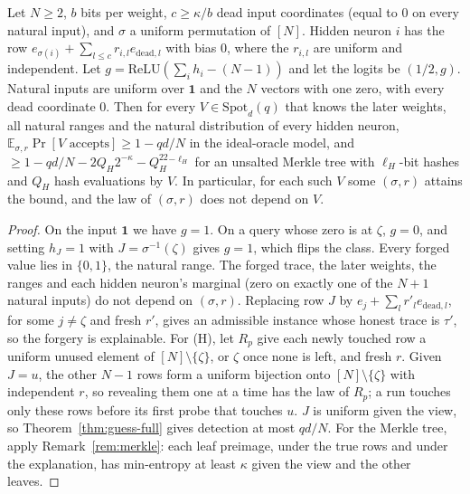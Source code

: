 \begin{proposition}
\label{prop:worst}
Let $N\ge2$, $b$ bits per weight, $c\ge\kappa/b$ dead input coordinates (equal to $0$ on every
natural input), and $\sigma$ a uniform permutation of $[N]$. Hidden neuron $i$ has the row
$e_{\sigma(i)}+\sum_{l\le c}r_{i,l}e_{\mathrm{dead},l}$ with bias $0$, where the $r_{i,l}$ are
uniform and independent. Let $g=\mathrm{ReLU}(\sum_ih_i-(N-1))$ and let the logits be $(1/2,g)$.
Natural inputs are uniform over $\mathbf 1$ and the $N$ vectors with one zero, with every dead
coordinate $0$. Then for every $V\in\mathrm{Spot}_d(q)$ that knows the later weights, all natural
ranges and the natural distribution of every hidden neuron,
$\mathbb E_{\sigma,r}\Pr[V\text{ accepts}]\ge1-qd/N$ in the ideal-oracle model, and
$\ge1-qd/N-2Q_H2^{-\kappa}-Q_H^22^{-\ell_H}$ for an unsalted Merkle tree with $\ell_H$-bit hashes and $Q_H$
hash evaluations by $V$. In particular, for each such $V$ some $(\sigma,r)$ attains the bound, and
the law of $(\sigma,r)$ does not depend on $V$.
\end{proposition}
\begin{proof}
On the input $\mathbf 1$ we have $g=1$. On a query whose zero is at $\zeta$, $g=0$, and setting
$h_J=1$ with $J=\sigma^{-1}(\zeta)$ gives $g=1$, which flips the class. Every forged value lies in
$\{0,1\}$, the natural range. The forged trace, the later weights, the ranges and each hidden
neuron's marginal (zero on exactly one of the $N+1$ natural inputs) do not depend on $(\sigma,r)$.
Replacing row $J$ by $e_j+\sum_l r'_le_{\mathrm{dead},l}$, for some $j\neq\zeta$ and fresh $r'$, gives
an admissible instance whose honest trace is $\tau'$, so the forgery is explainable. For (H), let
$R_p$ give each newly touched row a uniform unused element of $[N]\setminus\{\zeta\}$, or $\zeta$
once none is left, and fresh $r$. Given $J=u$, the other $N-1$ rows form a uniform bijection onto
$[N]\setminus\{\zeta\}$ with independent $r$, so revealing them one at a time has the law of $R_p$;
a run touches only these rows before its first probe that touches $u$. $J$ is uniform given the
view, so Theorem~\ref{thm:guess-full} gives detection at most $qd/N$. For the Merkle tree, apply
Remark~\ref{rem:merkle}: each leaf preimage, under the true rows and under the explanation, has
min-entropy at least $\kappa$ given the view and the other leaves.
\end{proof}

